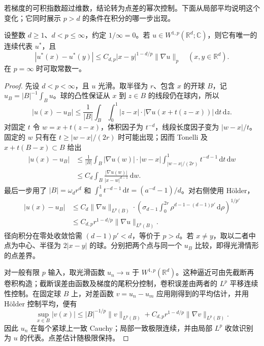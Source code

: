 \ProseParagraphBreak

若梯度的可积指数超过维数，结论转为点差的幂次控制。下面从局部平均说明这个变化；它同时展示 \(p>d\) 的条件在积分的哪一步出现。
\begin{proposition}\label{b2:prop:19-morrey}
设整数 \(d\geq1\)、\(d<p\leq\infty\)，约定 \(1/\infty=0\)。若 \(u\in W^{1,p}(\mathbb R^d;\mathbb C)\)，则它有唯一的连续代表 \(u^*\)，且
\[
 |u^*(x)-u^*(y)|
 \leq C_{d,p}|x-y|^{1-d/p}\|\nabla u\|_p
 \quad(x,y\in\mathbb R^d).
\]
在 \(p=\infty\) 时可取常数一。
\end{proposition}
\begin{proof}
先设 \(d<p<\infty\)，且 \(u\) 光滑。取半径为 \(r\)、包含 \(x\) 的开球 \(B\)，记 \(u_B=|B|^{-1}\int_Bu\)。球的凸性保证从 \(x\) 到 \(z\in B\) 的线段仍在球内，所以
\[
 |u(x)-u_B|
 \leq\frac1{|B|}\int_B\int_0^1
 |z-x|\cdot|\nabla u(x+t(z-x))|\,\mathrm dt\,\mathrm dz.
\]
对固定 \(t\) 令 \(w=x+t(z-x)\)，体积因子为 \(t^{-d}\)，线段长度因子变为 \(|w-x|/t\)。固定的 \(w\) 只有在 \(t\geq|w-x|/(2r)\) 时可能出现；因而 Tonelli 及 \(x+t(B-x)\subset B\) 给出
\[
 \begin{aligned}
 |u(x)-u_B|
 &\leq\frac1{|B|}\int_B|\nabla u(w)|\cdot|w-x|
       \int_{|w-x|/(2r)}^1t^{-d-1}\,\mathrm dt\,\mathrm dw\\
 &\leq C_d\int_B\frac{|\nabla u(w)|}{|x-w|^{d-1}}\,\mathrm dw.
 \end{aligned}
\]
最后一步用了 \(|B|=\omega_dr^d\) 和
\(\int_a^1t^{-d-1}\,\mathrm dt=(a^{-d}-1)/d\)。对右侧使用 Hölder，
\[
 \begin{aligned}
 |u(x)-u_B|
 &\leq C_d\|\nabla u\|_{L^p(B)}\cdot
 \left(\sigma_{d-1}\int_0^{2r}
       \rho^{d-1-(d-1)p'}\,\mathrm d\rho\right)^{1/p'}\\
 &\leq C_{d,p}r^{1-d/p}\|\nabla u\|_{L^p(B)}.
 \end{aligned}
\]
径向积分在零处收敛恰需 \((d-1)p'<d\)，等价于 \(p>d\)。若 \(x\ne y\)，取以二者中点为中心、半径为 \(2|x-y|\) 的球。分别把两个点与同一个 \(u_B\) 比较，即得光滑情形的点差界。

对一般有限 \(p\) 输入，取光滑函数 \(u_n\to u\) 于 \(W^{1,p}(\mathbb R^d)\)。这种逼近可由先截断再卷积构造；截断误差由函数及梯度的尾积分控制，卷积误差由两者的 \(L^p\) 平移连续性控制。在固定球 \(B\) 上，对差函数 \(v=u_n-u_m\) 应用刚得到的平均估计，并用 Hölder 控制平均，便有
\[
 \sup_{x\in B}|v(x)|
 \leq |B|^{-1/p}\|v\|_{L^p(B)}
       +C_{d,p}r^{1-d/p}\|\nabla v\|_{L^p(B)}.
\]
因此 \(u_n\) 在每个紧球上一致 Cauchy；局部一致极限连续，并由局部 \(L^p\) 收敛识别为 \(u\) 的代表。点差估计随极限保持。


\end{proof}
